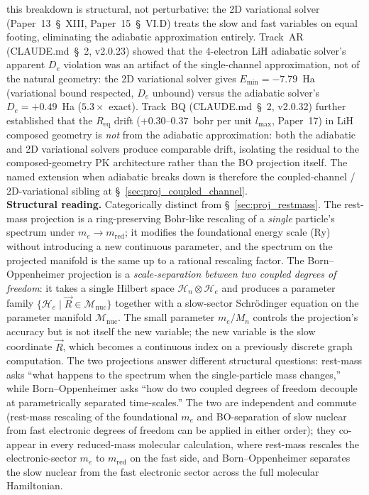 \documentclass[11pt]{article}
\begin{document}
this breakdown is structural, not perturbative: the 2D variational
solver (Paper~13~\S~XIII, Paper~15~\S~VI.D) treats the slow and fast
variables on equal footing, eliminating the adiabatic approximation
entirely.  Track~AR (CLAUDE.md~\S~2, v2.0.23) showed that the 4-electron
LiH adiabatic solver's apparent $D_e$ violation was an artifact of
the single-channel approximation, not of the natural geometry: the 2D
variational solver gives $E_\text{min} = -7.79$~Ha (variational bound
respected, $D_e$ unbound) versus the adiabatic solver's $D_e = +0.49$~Ha
($5.3\times$ exact).  Track~BQ (CLAUDE.md~\S~2, v2.0.32) further
established that the $R_\text{eq}$ drift ($+0.30$--$0.37$~bohr per unit $l_\text{max}$, Paper~17)
in LiH composed geometry is \emph{not} from the adiabatic
approximation: both the adiabatic and 2D variational solvers produce
comparable drift, isolating the residual to the composed-geometry PK
architecture rather than the BO projection itself.  The named extension
when adiabatic breaks down is therefore the coupled-channel /
2D-variational sibling at \S~\ref{sec:proj_coupled_channel}.\\
\textbf{Structural reading.}  Categorically distinct from
\S~\ref{sec:proj_restmass}.  The rest-mass projection is a
ring-preserving Bohr-like rescaling of a \emph{single} particle's
spectrum under $m_e \to m_\text{red}$; it modifies the foundational
energy scale (Ry) without introducing a new continuous parameter,
and the spectrum on the projected manifold is the same up to a
rational rescaling factor.  The Born--Oppenheimer projection is a
\emph{scale-separation between two coupled degrees of freedom}: it
takes a single Hilbert space $\mathcal{H}_n \otimes \mathcal{H}_e$ and
produces a parameter family $\{ \mathcal{H}_e \mid \vec{R} \in
\mathcal{M}_\text{nuc} \}$ together with a slow-sector Schr\"odinger
equation on the parameter manifold $\mathcal{M}_\text{nuc}$.  The
small parameter $m_e / M_n$ controls the projection's accuracy but is
not itself the new variable; the new variable is the slow coordinate
$\vec{R}$, which becomes a continuous index on a previously discrete
graph computation.  The two projections answer different structural
questions: rest-mass asks ``what happens to the spectrum when the
single-particle mass changes,'' while Born--Oppenheimer asks ``how
do two coupled degrees of freedom decouple at parametrically separated
time-scales.''
The two are independent and commute (rest-mass rescaling of the
foundational $m_e$ and BO-separation of slow nuclear from fast
electronic degrees of freedom can be applied in either order); they
co-appear in every reduced-mass molecular calculation, where
rest-mass rescales the electronic-sector $m_e$ to $m_\text{red}$ on
the fast side, and Born--Oppenheimer separates the slow nuclear from
the fast electronic sector across the full molecular Hamiltonian.
\end{document}
